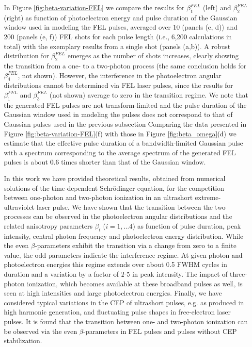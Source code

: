 In Figure \ref{fig:beta-variation-FEL} we compare the results for $\beta_1^{FEL}$ (left) and $\beta_2^{FEL}$ (right) as function of photoelectron energy and pulse duration of the Gaussian window used in modeling the FEL pulses, averaged over 10 (panels (c, d)) and 200 (panels (e, f)) FEL shots for each pulse length (i.e., 6,200 calculations in total) with the exemplary results from a single shot (panels (a,b)). A robust distribution for $\beta_2^{FEL}$ emerges as the number of shots increases, clearly showing the transition from a one- to a two-photon process (the same conclusion holds for $\beta_4^{FEL}$, not shown). However, the interference in the photoelectron angular distributions cannot be determined via FEL laser pulses, since the results for $\beta_1^{FEL}$ and $\beta_3^{FEL}$ (not shown) average to zero in the transition regime. 
We note that the generated FEL pulses are not transform-limited and the pulse duration of the Gaussian window used in modeling the pulses does not correspond to that of Gaussian pulses used in the previous subsection
Comparing the data presented in Figure \ref{fig:beta-variation-FEL}(f) with those in Figure \ref{fig:beta_omega}(d) we estimate that the effective pulse duration of a bandwidth-limited Gaussian pulse with a spectrum corresponding to the average spectrum of the generated FEL pulses is about 0.6 times shorter than that of the Gaussian window.

In this work we have provided theoretical results, obtained from numerical solutions of the time-dependent Schr\"odinger equation, for the competition between one-photon and two-photon ionization in an ultrashort extreme-ultraviolet laser pulse. We have shown that the transition between the two processes can be observed in the photoelectron angular distributions and the related anisotropy parameters $\beta_i$ ($i = 1, \ldots 4$) as function of pulse duration, peak intensity, central photon frequency and photoelectron energy distribution. While the even $\beta$-parameters exhibit the transition via a change from zero to a finite value, the odd parameters indicate the interference regime. At given photon and photoelectron energies this regime extends over about 0.5 FWHM cycles in duration and a variation by a factor of 2-5 in peak intensity. The impact of three-photon ionization, which becomes available at these broadband pulses as well, is seen at high intensities and large photoelectron energies. Finally, we have considered typical variations in the CEP of ultrashort pulses, e.g. as produced in high harmonic generation, and fluctuating pulse shapes in free-electron laser pulses. It is found that the transition between one- and two-photon ionization can be observed via the even $\beta$-parameters in FEL pulses and pulses without CEP stabilization.


